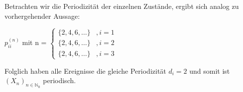 \documentclass[a4paper]{scrartcl}
\newcommand{\N}{\mathbb{N}}
\def \blattnr {3}
\begin{document}
\begin{enumerate}[label=\bfseries \blattnr.\arabic*]
\begin{enumerate}
      Betrachten wir die Periodizität der einzelnen Zustände, ergibt sich analog zu vorhergehender Aussage:
      
      $p^{(n)}_{ii}$ mit n = 
      $\begin{cases} 
	\{ 2,4,6,\ldots \} &, i = 1 \\
	\{ 2,4,6,\ldots\} &, i = 2 \\
	\{ 2,4,6,\ldots\} &, i = 3
      \end{cases}
      $
      
      Folglich haben alle Ereignisse die gleiche Periodizität $d_i=2$ und somit ist $(X_n)_{n\in\N_0}$ periodisch.
     \end{enumerate}


\end{enumerate}
\end{document}

